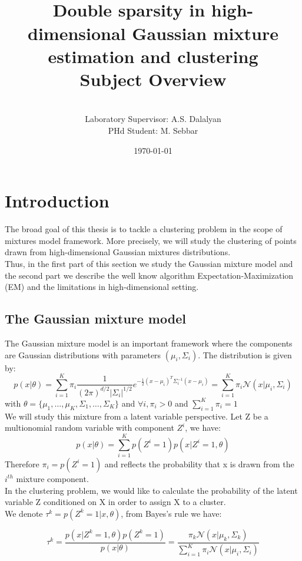 \documentclass[12pt]{article}
\title{\vspace{-60pt}~\\Double sparsity in high-dimensional Gaussian mixture estimation and clustering\\Subject Overview}
\author{\vspace{-20pt}~\\ Laboratory Supervisor: A.S. Dalalyan\\
PHd Student: M. Sebbar}
\date{\today}
\begin{document}
\maketitle
\tableofcontents
\newpage
\section{Introduction}
The broad goal of this thesis is to tackle a clustering problem in the scope of mixtures model framework. More precisely, we will study the clustering of points drawn from high-dimensional Gaussian mixtures distributions.\\Thus, in the first part of this section we study the Gaussian mixture model and the second part we describe the well know algorithm Expectation-Maximization (EM) and the limitations in high-dimensional setting.
\subsection{The Gaussian mixture model}

The Gaussian mixture model is an important framework where the components are Gaussian distributions with parameters $(\mu_i,\Sigma_i)$. The distribution is given by:
\begin{equation}
p(x|\theta)=\sum_{i=1}^K\pi_i\frac{1}{(2\pi)^{d/2}|\Sigma_i|^{1/2}} e^{-\frac{1}{2}(x-\mu_i)^T\Sigma_i^{-1}(x-\mu_i)}=\sum_{i=1}^K\pi_i\mathcal N(x|\mu_i,\Sigma_i)
\end{equation}
with $\theta=\{\mu_1,\dots,\mu_K,\Sigma_1,\dots,\Sigma_K\}$ and $\forall i, \pi_i>0$ and $\sum_{i=1}^K\pi_i=1$
\\

We will study this mixture from a latent variable perspective. Let Z be a multionomial random variable with component $Z^i$, we have:
\begin{equation}
p(x|\theta)=\sum_{i=1}^K p(Z^i=1)p(x|Z^i=1,\theta)
\end{equation}
Therefore $\pi_i=p(Z^i=1)$ and reflects the probability that x is drawn from the $i^{th}$ mixture component.\\

In the clustering problem, we would like to calculate the probability of the latent variable Z conditioned on X in order to assign X to a cluster.\\
We denote $\tau^k=p(Z^k=1|x,\theta)$, from Bayes's rule we have:

\begin{equation}
\label{tau_bayes}
\tau^k=\frac{p(x|Z^k=1,\theta)p(Z^k=1)}{p(x|\theta)}=\frac{\pi_k \mathcal N(x|\mu_k,\Sigma_k)}{\sum_{i=1}^K\pi_i\mathcal N(x|\mu_i,\Sigma_i)}
\end{equation}
\end{document}
